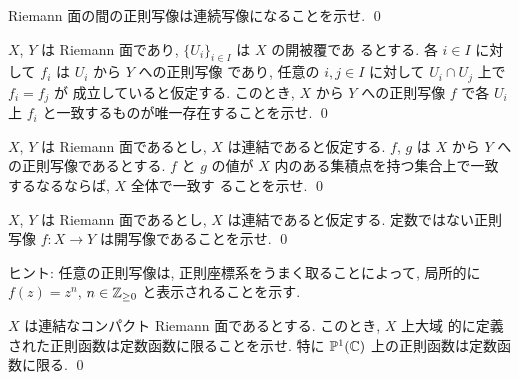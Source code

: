 \documentclass[12pt,twoside]{jarticle}
\def\Z{{\Bbb Z}} %
\def\C{{\Bbb C}} %
\def\P{{\Bbb P}}
\begin{document}
\begin{question}[正則写像の連続性]
  Riemann 面の間の正則写像は連続写像になることを示せ. \qed
\end{question}

\begin{question}[正則写像の貼り合わせ]
  $X$, $Y$ は Riemann 面であり, $\{U_i\}_{i\in I}$ は $X$ の開被覆であ
  るとする. 各 $i\in I$ に対して $f_i$ は $U_i$ から $Y$ への正則写像
  であり, 任意の $i,j\in I$ に対して $U_i\cap U_j$ 上で $f_i = f_j$ が
  成立していると仮定する. このとき, $X$ から $Y$ への正則写像 $f$ で各 %
  $U_i$ 上 $f_i$ と一致するものが唯一存在することを示せ. \qed
\end{question}

\begin{question}[正則写像の一致の定理]
  $X$, $Y$ は Riemann 面であるとし, $X$ は連結であると仮定する. %
  $f$, $g$ は $X$ から $Y$ への正則写像であるとする. $f$ と $g$ の値が 
  $X$ 内のある集積点を持つ集合上で一致するなるならば, $X$ 全体で一致す
  ることを示せ. \qed
\end{question}

\begin{question}[定数でない正則写像の開写像性]
  $X$, $Y$ は Riemann 面であるとし, $X$ は連結であると仮定する. %
  定数ではない正則写像 $f : X \to Y$ は開写像であることを示せ. \qed
\end{question}

\noindent ヒント: 任意の正則写像は, 正則座標系をうまく取ることによって,
局所的に $f(z) = z^n$, $n\in\Z_{\ge0}$ と表示されることを示す. 

\begin{question}\qstar{*}
  $X$ は連結なコンパクト Riemann 面であるとする. このとき, $X$ 上大域
  的に定義された正則函数は定数函数に限ることを示せ. 
  特に $\P^1(\C)$ 上の正則函数は定数函数に限る. \qed
\end{question}
\end{document}
